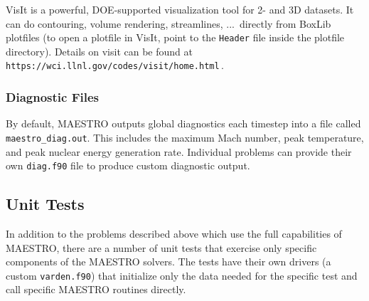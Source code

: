 VisIt is a powerful, DOE-supported visualization tool for 2- and 3D
datasets.  It can do contouring, volume rendering, streamlines, ...\
directly from BoxLib plotfiles (to open a plotfile in VisIt, point to
the {\tt Header} file inside the plotfile directory).  Details on
visit can be found at {\tt https://wci.llnl.gov/codes/visit/home.html}\,.

\subsubsection{Diagnostic Files}

By default, MAESTRO outputs global diagnostics each timestep into a file
called {\tt maestro\_diag.out}.  This includes the maximum Mach number,
peak temperature, and peak nuclear energy generation rate.  Individual problems
can provide their own {\tt diag.f90} file to produce custom diagnostic
output.


\subsection{Unit Tests}

\label{sec:unit_tests}

In addition to the problems described above which use the full
capabilities of MAESTRO, there are a number of unit tests that
exercise only specific components of the MAESTRO solvers.  The
tests have their own drivers (a custom {\tt varden.f90}) that
initialize only the data needed for the specific test and call
specific MAESTRO routines directly.


